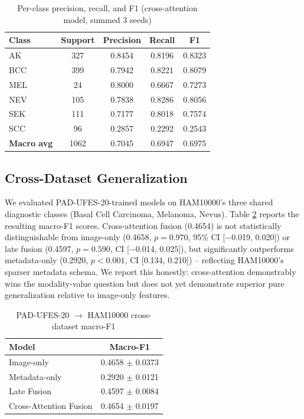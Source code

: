 \documentclass[conference]{IEEEtran}
\begin{document}
\begin{table}[t]
\caption{Per-class precision, recall, and F1 (cross-attention model, summed 3 seeds)}
\label{tab:perclass}
\centering
\begin{tabular}{|l|c|c|c|c|}
\hline
\textbf{Class} & \textbf{Support} & \textbf{Precision} & \textbf{Recall} & \textbf{F1} \\
\hline
AK & 327 & 0.8454 & 0.8196 & 0.8323 \\
\hline
BCC & 399 & 0.7942 & 0.8221 & 0.8079 \\
\hline
MEL & 24 & 0.8000 & 0.6667 & 0.7273 \\
\hline
NEV & 105 & 0.7838 & 0.8286 & 0.8056 \\
\hline
SEK & 111 & 0.7177 & 0.8018 & 0.7574 \\
\hline
SCC & 96 & 0.2857 & 0.2292 & 0.2543 \\
\hline
\textbf{Macro avg} & 1062 & 0.7045 & 0.6947 & 0.6975 \\
\hline
\end{tabular}
\end{table}

\subsection{Cross-Dataset Generalization}
We evaluated PAD-UFES-20-trained models on HAM10000's three shared diagnostic classes (Basal Cell Carcinoma, Melanoma, Nevus). Table \ref{tab:crossdataset} reports the resulting macro-F1 scores. Cross-attention fusion (0.4654) is not statistically distinguishable from image-only (0.4658, $p=0.970$, 95\% CI [$-$0.019, 0.020]) or late fusion (0.4597, $p=0.590$, CI [$-$0.014, 0.025]), but significantly outperforms metadata-only (0.2920, $p<0.001$, CI [0.134, 0.210]) -- reflecting HAM10000's sparser metadata schema. We report this honestly: cross-attention demonstrably wins the modality-value question but does not yet demonstrate superior pure generalization relative to image-only features.

\begin{table}[t]
\caption{PAD-UFES-20 $\rightarrow$ HAM10000 cross-dataset macro-F1}
\label{tab:crossdataset}
\centering
\begin{tabular}{|l|c|}
\hline
\textbf{Model} & \textbf{Macro-F1} \\
\hline
Image-only & 0.4658 $\pm$ 0.0373 \\
\hline
Metadata-only & 0.2920 $\pm$ 0.0121 \\
\hline
Late Fusion & 0.4597 $\pm$ 0.0084 \\
\hline
Cross-Attention Fusion & 0.4654 $\pm$ 0.0197 \\
\hline
\end{tabular}
\end{table}
\end{document}
